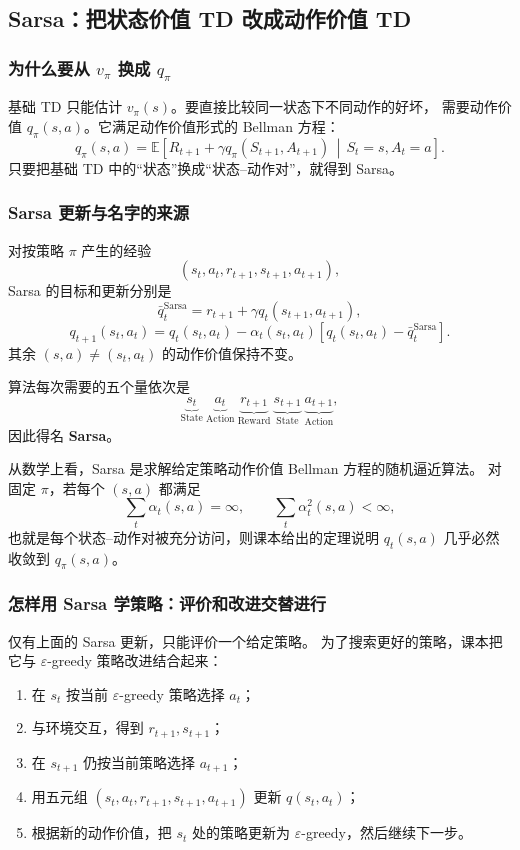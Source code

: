 \documentclass[11pt,a4paper,fontset=fandol]{ctexart}
\newcommand{\E}{\mathbb{E}}
\newcommand{\given}{\,\middle|\,}
\begin{document}
\subsection{Sarsa：把状态价值 TD 改成动作价值 TD}

\subsubsection{为什么要从 \(v_\pi\) 换成 \(q_\pi\)}

基础 TD 只能估计 \(v_\pi(s)\)。要直接比较同一状态下不同动作的好坏，
需要动作价值 \(q_\pi(s,a)\)。它满足动作价值形式的 Bellman 方程：
\[
\boxed{
q_\pi(s,a)
=
\E\!\left[
R_{t+1}+\gamma q_\pi(S_{t+1},A_{t+1})
\given S_t=s,A_t=a
\right]}.
\]
只要把基础 TD 中的“状态”换成“状态--动作对”，就得到 Sarsa。

\subsubsection{Sarsa 更新与名字的来源}

对按策略 \(\pi\) 产生的经验
\[
(s_t,a_t,r_{t+1},s_{t+1},a_{t+1}),
\]
Sarsa 的目标和更新分别是
\[
\bar q_t^{\mathrm{Sarsa}}
=
r_{t+1}+\gamma q_t(s_{t+1},a_{t+1}),
\]
\[
\boxed{
q_{t+1}(s_t,a_t)
=
q_t(s_t,a_t)
-\alpha_t(s_t,a_t)
\left[
q_t(s_t,a_t)-\bar q_t^{\mathrm{Sarsa}}
\right]}.
\]
其余 \((s,a)\neq(s_t,a_t)\) 的动作价值保持不变。

算法每次需要的五个量依次是
\[
\underbrace{s_t}_{\text{State}}
\ \underbrace{a_t}_{\text{Action}}
\ \underbrace{r_{t+1}}_{\text{Reward}}
\ \underbrace{s_{t+1}}_{\text{State}}
\ \underbrace{a_{t+1}}_{\text{Action}},
\]
因此得名 \textbf{Sarsa}。

从数学上看，Sarsa 是求解给定策略动作价值 Bellman 方程的随机逼近算法。
对固定 \(\pi\)，若每个 \((s,a)\) 都满足
\[
\sum_t\alpha_t(s,a)=\infty,
\qquad
\sum_t\alpha_t^2(s,a)<\infty,
\]
也就是每个状态--动作对被充分访问，则课本给出的定理说明
\(q_t(s,a)\) 几乎必然收敛到 \(q_\pi(s,a)\)。

\subsubsection{怎样用 Sarsa 学策略：评价和改进交替进行}

仅有上面的 Sarsa 更新，只能评价一个给定策略。
为了搜索更好的策略，课本把它与 \(\varepsilon\)-greedy
策略改进结合起来：

\begin{enumerate}
  \item 在 \(s_t\) 按当前 \(\varepsilon\)-greedy 策略选择 \(a_t\)；
  \item 与环境交互，得到 \(r_{t+1},s_{t+1}\)；
  \item 在 \(s_{t+1}\) 仍按当前策略选择 \(a_{t+1}\)；
  \item 用五元组
  \((s_t,a_t,r_{t+1},s_{t+1},a_{t+1})\)
  更新 \(q(s_t,a_t)\)；
  \item 根据新的动作价值，把 \(s_t\) 处的策略更新为
  \(\varepsilon\)-greedy，然后继续下一步。
\end{enumerate}
\end{document}
